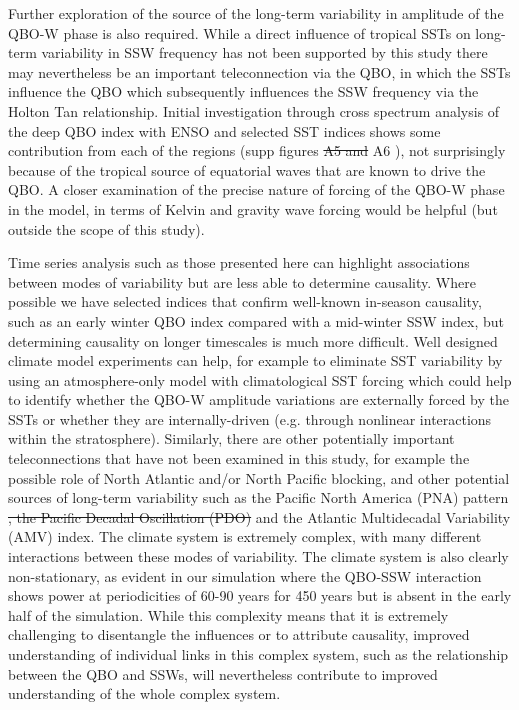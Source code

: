 \documentclass[wcd, manuscript]{copernicus}
\providecommand{\DIFadd}[1]{{\protect\color{blue}\uwave{#1}}} %
\providecommand{\DIFdel}[1]{{\protect\color{red}\sout{#1}}}                      %
\providecommand{\DIFaddbegin}{} %
\providecommand{\DIFaddend}{} %
\providecommand{\DIFdelbegin}{} %
\providecommand{\DIFdelend}{} %
\begin{document}
Further exploration of the source of the long-term variability in amplitude of the QBO-W phase is also required. While a direct influence of tropical SSTs on long-term variability in SSW frequency has not been supported by this study there may nevertheless be an important teleconnection via the QBO, in which the SSTs influence the QBO which subsequently influences the SSW frequency via the Holton Tan relationship. Initial investigation through cross spectrum analysis of the deep QBO index with ENSO and selected SST indices shows some contribution from each of the regions (supp figures \DIFdelbegin \DIFdel{A5 and }\DIFdelend A6 \DIFaddbegin \DIFadd{and A7}\DIFaddend ), not surprisingly because of the tropical source of equatorial waves that are known to drive the QBO. A closer examination of the precise nature of forcing of the QBO-W phase in the model, in terms of Kelvin and gravity wave forcing would be helpful (but outside the scope of this study). 

Time series analysis such as those presented here can highlight associations between modes of variability but are less able to determine causality. Where possible we have selected indices that confirm well-known in-season causality, such as an early winter QBO index compared with a mid-winter SSW index, but determining causality on longer timescales is much more difficult. Well designed climate model experiments can help, for example to eliminate SST variability by using an atmosphere-only model with climatological SST forcing which could help to identify whether the QBO-W amplitude variations are externally forced by the SSTs or whether they are internally-driven (e.g. through nonlinear interactions within the stratosphere).  Similarly, there are other potentially important teleconnections that have not been examined in this study, for example the possible role of North Atlantic and/or North Pacific blocking, and other potential sources of long-term variability such as the Pacific North America (PNA) pattern \DIFdelbegin \DIFdel{, the Pacific Decadal Oscillation (PDO) }\DIFdelend and the Atlantic Multidecadal Variability (AMV) index. The climate system is extremely complex, with many different interactions between these modes of variability. The climate system is also clearly non-stationary, as evident in our simulation where the QBO-SSW interaction shows power at periodicities of 60-90 years for 450 years but is absent in the early half of the simulation. While this complexity means that it is extremely challenging to disentangle the influences or to attribute causality, improved understanding of individual links in this complex system, such as the relationship between the QBO and SSWs, will nevertheless contribute to improved understanding of the whole complex system.   
\end{document}

